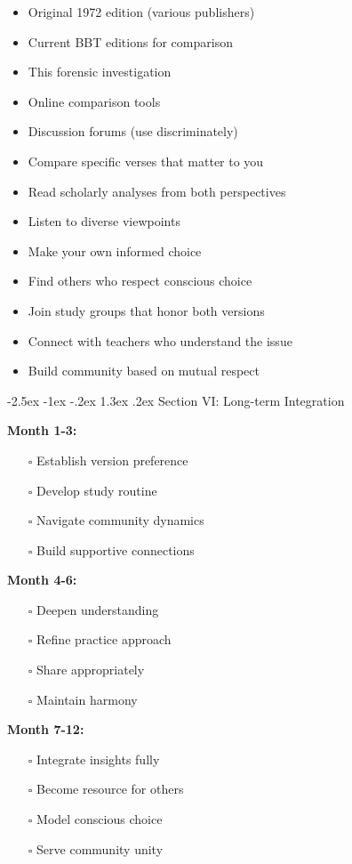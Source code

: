 \documentclass[12pt,twoside]{book}
\makeatletter
\renewcommand\section{\@startsection{section}{1}{\z@}%
{-2.5ex \@plus -1ex \@minus -.2ex}%
{1.3ex \@plus.2ex}%
{\normalfont\Large\bfseries}}
\makeatother
\begin{document}
\begin{itemize}
\item Original 1972 edition (various publishers)
\item Current BBT editions for comparison
\item This forensic investigation
\item Online comparison tools
\item Discussion forums (use discriminately)

\item Compare specific verses that matter to you
\item Read scholarly analyses from both perspectives
\item Listen to diverse viewpoints
\item Make your own informed choice

\item Find others who respect conscious choice
\item Join study groups that honor both versions
\item Connect with teachers who understand the issue
\item Build community based on mutual respect
\end{itemize}
\section{Section VI: Long-term Integration}
\label{sec:orga24e5a9}

\textbf{\textbf{Month 1-3:}}
\begin{itemize}
\item[{$\square$}] Establish version preference
\item[{$\square$}] Develop study routine
\item[{$\square$}] Navigate community dynamics
\item[{$\square$}] Build supportive connections
\end{itemize}

\textbf{\textbf{Month 4-6:}}
\begin{itemize}
\item[{$\square$}] Deepen understanding
\item[{$\square$}] Refine practice approach
\item[{$\square$}] Share appropriately
\item[{$\square$}] Maintain harmony
\end{itemize}

\textbf{\textbf{Month 7-12:}}
\begin{itemize}
\item[{$\square$}] Integrate insights fully
\item[{$\square$}] Become resource for others
\item[{$\square$}] Model conscious choice
\item[{$\square$}] Serve community unity
\end{itemize}
\end{document}

